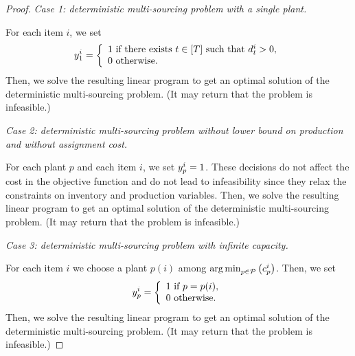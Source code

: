 \begin{proof}
\emph{Case 1: deterministic multi-sourcing problem with a single plant.}

For each item $i$, we set
$$
\open_1^i=
\left\{
\begin{array}{l}
1\mbox{ if there exists }t\in\range{\horizon}\mbox{ such that }\demand_t^i>0,\\
0\mbox{ otherwise}.
\end{array}
\right.
$$
Then, we solve the resulting linear program to get an optimal solution of the deterministic multi-sourcing problem.
(It may return that the problem is infeasible.)

\medskip

\emph{Case 2: deterministic multi-sourcing problem without lower bound on production and without assignment cost.}

For each plant $p$ and each item $i$, we set $y_p^i=1$.
These decisions do not affect the cost in the objective function and do not lead to infeasibility since they relax the constraints on inventory and production variables.
Then, we solve the resulting linear program to get an optimal solution of the deterministic multi-sourcing problem.
(It may return that the problem is infeasible.)

\medskip

\emph{Case 3: deterministic multi-sourcing problem with infinite capacity.}

For each item $i$ we choose a plant $p(i)$ among $\argmin_{p\in\plants}\bracket{\affect_p^i}$.
Then, we set
$$
\open_p^i=
\left\{
\begin{array}{l}
1\mbox{ if }p=p(i),\\
0\mbox{ otherwise}.
\end{array}
\right.
$$
Then, we solve the resulting linear program to get an optimal solution of the deterministic multi-sourcing problem.
(It may return that the problem is infeasible.)
\end{proof}


